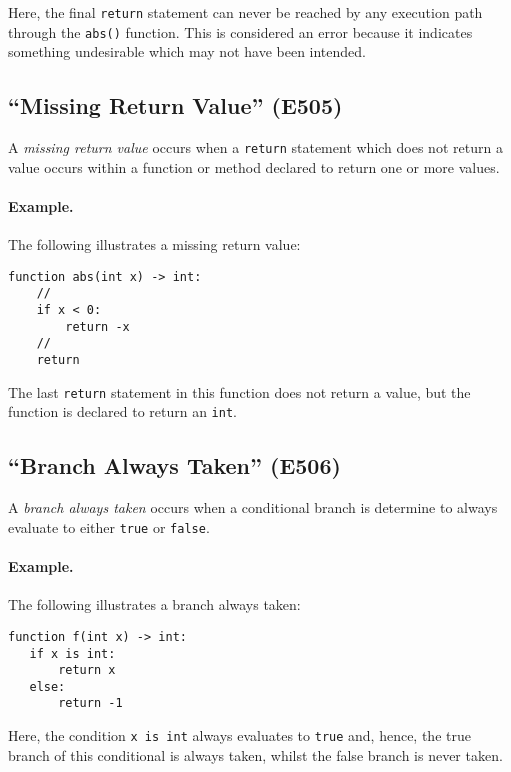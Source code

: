 Here, the final \lstinline{return} statement can never be reached by any execution path through the \lstinline{abs()} function.  This is considered an error because it indicates something undesirable which may not have been intended.

\subsection{``Missing Return Value'' (E505)}

A {\em missing return value} occurs when a \lstinline{return} statement which does not return a value occurs within a function or method declared to return one or more values.  

\paragraph{Example.} The following illustrates a missing return value:

\begin{lstlisting}
function abs(int x) -> int:
    //
    if x < 0:
        return -x
    //
    return
\end{lstlisting}

The last \lstinline{return} statement in this function does not return a value, but the function is declared to return an \lstinline{int}.

\subsection{``Branch Always Taken'' (E506)}

A {\em branch always taken} occurs when a conditional branch is determine to always evaluate to either \lstinline{true} or \lstinline{false}.  

\paragraph{Example.} The following illustrates a branch always taken:

\begin{lstlisting}
function f(int x) -> int:
   if x is int:
       return x
   else:
       return -1
\end{lstlisting}

Here, the condition \lstinline{x is int} always evaluates to \lstinline{true} and, hence, the true branch of this conditional is always taken, whilst the false branch is never taken.

